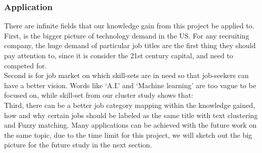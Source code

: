 \documentclass[10pt,mathserif]{beamer}
\begin{document}
	\begin{frame}
	\frametitle{Application}
There are infinite fields that our knowledge gain from this project be applied to. First, is the bigger picture of technology demand in  the US. For any recruiting company, the huge demand of particular job titles are the first thing they should pay attention to, since it is consider the 21st century capital, and need to competed for.\\
Second is for job market on which skill-sets are in need so that job-seekers can have a better vision. Words like `A.I.' and `Machine learning' are too vague to be focused on, while skill-set from our cluster study shows that:\\
Third, there can be a better job category mapping within the knowledge gained, how and why certain jobs should be labeled as the same title with text clustering and Fuzzy matching. 
Many applications can be achieved with the future work on the same topic, due to the time limit for this project, we will sketch out the big picture for the future study in the next section. 
	
\end{frame}
\end{document}
